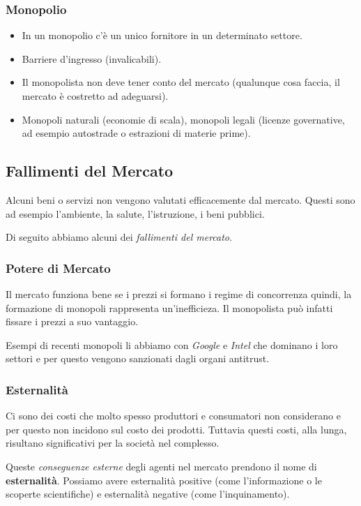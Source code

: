 \documentclass[a4paper,portrait,12pt]{article}
\theoremstyle{definition}
\begin{document}
\subsubsection{Monopolio}
\begin{itemize}
\item In un monopolio c'è un unico fornitore in un determinato settore.
\item Barriere d'ingresso (invalicabili).
\item Il monopolista non deve tener conto del mercato (qualunque cosa faccia, il mercato è costretto ad adeguarsi).
\item Monopoli naturali (economie di scala), monopoli legali (licenze governative, ad esempio autostrade o estrazioni di materie prime).
\end{itemize}

\subsection{Fallimenti del Mercato}

Alcuni beni o servizi non vengono valutati efficacemente dal mercato.
Questi sono ad esempio l'ambiente, la salute, l'istruzione, i beni pubblici.

Di seguito abbiamo alcuni dei \emph{fallimenti del mercato}.

\subsubsection{Potere di Mercato}
Il mercato funziona bene se i prezzi si formano i regime di concorrenza quindi, la formazione di monopoli rappresenta un'inefficieza.
Il monopolista può infatti fissare i prezzi a suo vantaggio.

Esempi di recenti monopoli li abbiamo con \emph{Google} e \emph{Intel} che dominano i loro settori e per questo vengono sanzionati dagli organi antitrust.

\subsubsection{Esternalità}
Ci sono dei costi che molto spesso produttori e consumatori non considerano e per questo non incidono sul costo dei prodotti.
Tuttavia questi costi, alla lunga, risultano significativi per la società nel complesso.

Queste \emph{conseguenze esterne} degli agenti nel mercato prendono il nome di \textbf{esternalità}.
Possiamo avere esternalità positive (come l'informazione o le scoperte scientifiche) e esternalità negative (come l'inquinamento).\\
\end{document}
